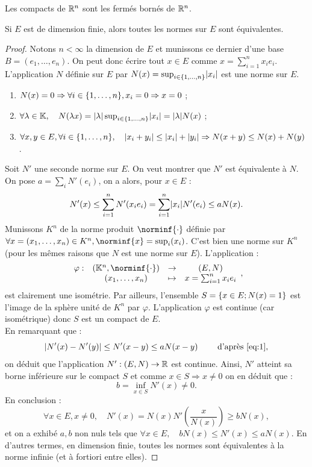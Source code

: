 \begin{lem}
Les compacts de $\mathbb{R}^n$ sont les fermés bornés de $\mathbb{R}^n$.
\end{lem}

\begin{thm}
Si $E$ est de dimension finie, alors toutes les normes sur $E$ sont équivalentes.
\end{thm}

\begin{proof}
Notons $n < \infty$ la dimension de $E$ et munissons ce dernier d'une base $B=(e_1, \dots, e_n)$.
On peut donc écrire tout $x \in E$ comme $x = \sum_{i=1}^n x_i e_i$. 
L'application $N$ définie sur $E$ par $N(x) = \sup_{i \in \{ 1, \dots, n \}} \lvert x_i\rvert$ est une norme sur $E$.
\begin{enumerate}[label=(\roman*)]
\item $N(x) = 0 \Rightarrow \forall i \in \{ 1, \dots, n \}, x_i=0 \Rightarrow x = 0$ ;
\item $\forall \lambda \in \mathbb{K}, \quad N(\lambda x) = \lvert\lambda\rvert \sup_{i \in \{ 1, \dots, n \}} \lvert x_i\rvert = \lvert\lambda\rvert N(x)$ ;
\item $\forall x,y \in E, \forall i \in \{ 1, \dots, n \}, \quad \lvert x_i+y_i\rvert \leq \lvert x_i\rvert + \lvert y_i\rvert \Rightarrow N(x+y) \leq N(x) + N(y)$.
\end{enumerate}
Soit $N'$ une seconde norme sur $E$. On veut montrer que $N'$ est équivalente à $N$.
On pose $a = \sum_i N'(e_i)$, on a alors, pour $x \in E$ :
\begin{equation} N'(x) \leq \sum_{i=1}^n N'(x_i e_i) = \sum_{i=1}^n \lvert x_i\rvert N'(e_i) \leq a N(x) . \label{eq:1} \end{equation}
Munissons $K^n$ de la norme produit $\norminf{\cdot}$ définie par $\forall x=(x_1, \dots, x_n) \in K^n, \norminf{x} = \sup_i(x_i)$. 
C'est bien une norme sur $K^n$ (pour les mêmes raisons que $N$ est une norme sur $E$). 
L'application :
\[ \begin{array}{c c c c} 
\varphi : & (\K^n, \norminf{\cdot}) & \to & (E, N) \\
& (x_1, \dots, x_n) & \mapsto & x= \sum_{i=1}^n x_i e_i 
\end{array} , \]
est clairement une isométrie. Par ailleurs, l'ensemble $S=\{ x \in E; N(x) =1 \}$ est l'image de la sphère unité de $K^n$ par $\varphi$.
L'application $\varphi$ est continue (car isométrique) donc $S$ est un compact de $E$. \\
En remarquant que :
\[ \lvert N'(x) - N'(y)\rvert \leq N'(x-y) \leq a N(x-y) \qquad \text{ d'après \ref{eq:1}} , \]
on déduit que l'application $N' : (E, N) \to \mathbb{R}$ est continue. Ainsi, $N'$ atteint sa borne inférieure sur le compact $S$ et comme
$x \in S \Rightarrow x \neq 0$ on en déduit que : 
\[ b = \inf_{x \in S} N'(x) \neq 0 . \]
En conclusion :
\[ \forall x \in E, x \neq 0, \quad N'(x) = N(x) N' \left ( \dfrac{x}{N(x)} \right ) \geq b N(x) , \]
et on a exhibé $a, b$ non nuls tels que $\forall x \in E, \quad b N(x) \leq N'(x) \leq aN(x)$. 
En d'autres termes, en dimension finie, toutes les normes sont équivalentes à la norme infinie (et à fortiori entre elles).
\end{proof}

